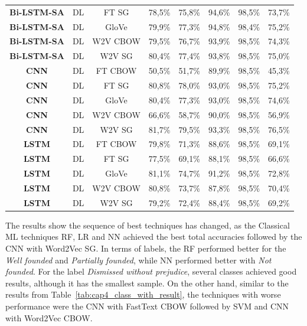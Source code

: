 \begin{table}[htb]
\begin{tabular}{@{}cccrrrrr@{}}
\textbf{Bi-LSTM-SA}  & \gls{DL} & FT \gls{SG} & 78,5\% & 75,8\% & 94,6\% & 98,5\% & 73,7\% \\
\textbf{Bi-LSTM-SA}  & \gls{DL} & GloVe & 79,9\% & 77,3\% & 94,8\% & 98,4\% & 75,2\% \\
\textbf{Bi-LSTM-SA} & \gls{DL}  & W2V CBOW & 79,5\% & 76,7\% & 93,9\% & 98,5\% & 74,3\% \\
\textbf{Bi-LSTM-SA}  & \gls{DL} & W2V \gls{SG} & 80,4\% & 77,4\% & 93,8\% & 98,5\% & 75,0\% \\
\textbf{CNN}  & \gls{DL} & FT CBOW & 50,5\% & 51,7\% & 89,9\% & 98,5\% & 45,3\% \\
\textbf{CNN}  & \gls{DL} & FT \gls{SG} & 80,8\% & 78,0\% & 93,0\% & 98,5\% & 75,2\% \\
\textbf{CNN} & \gls{DL}  & GloVe & 80,4\% & 77,3\% & 93,0\% & 98,5\% & 74,6\% \\
\textbf{CNN}  & \gls{DL} & W2V CBOW & 66,6\% & 58,7\% & 90,0\% & 98,5\% & 56,9\% \\
\textbf{CNN} & \gls{DL}  & W2V \gls{SG} & 81,7\% & 79,5\% & 93,3\% & 98,5\% & 76,5\% \\
\textbf{LSTM}  & \gls{DL} & FT CBOW & 79,8\% & 71,3\% & 88,6\% & 98,5\% & 69,1\% \\
\textbf{LSTM}  & \gls{DL} & FT \gls{SG} & 77,5\% & 69,1\% & 88,1\% & 98,5\% & 66,6\% \\
\textbf{LSTM} & \gls{DL}  & GloVe & 81,1\% & 74,7\% & 91,2\% & 98,5\% & 72,8\% \\
\textbf{LSTM}  & \gls{DL} & W2V CBOW & 80,8\% & 73,7\% & 87,8\% & 98,5\% & 70,4\% \\
\textbf{LSTM} & \gls{DL}  & W2V \gls{SG} & 79,2\% & 72,4\% & 88,4\% & 98,5\% & 69,2\% \\ \bottomrule
\end{tabular}

\end{table}

The results show the sequence of best techniques has changed, as the Classical ML techniques \gls{RF}, \gls{LR} and \gls{NN} achieved the best total accuracies followed by the \gls{CNN} with Word2Vec \gls{SG}. In terms of labels, the RF performed better for the \emph{Well founded} and  \emph{Partially founded}, while \gls{NN} performed better with \emph{Not founded}. For the label \textit{Dismissed without prejudice}, several classes achieved good results, although it has the smallest sample. On the other hand, similar to the results from Table~\ref{tab:cap4_class_with_result}, the techniques with worse performance were the \gls{CNN} with FastText CBOW followed by \gls{SVM} and \gls{CNN} with Word2Vec CBOW.


